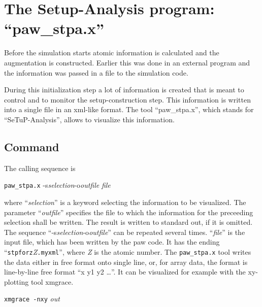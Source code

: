 \documentclass[final,12pt,makeidx,DIV=calc]{article}
\begin{document}
{{{{{{%
\newpage
\section{The Setup-Analysis program: ``paw\_stpa.x''}
Before the simulation starts atomic information is calculated and the
augmentation is constructed. Earlier this was done in an external
program and the information was passed in a file to the simulation code.

During this initialization step a lot of information is created that
is meant to control and to monitor the setup-construction step. This
information is written into a single file in an xml-like format. The
tool ``paw\_stpa.x'', which stands for ``SeTuP-Analysis'', allows to
visualize this information.

\subsection{Command}

The calling sequence is
\begin{center}
\verb|paw_stpa.x| 
\quad-s\quad\textit{selection}\quad\textrm{-o}\quad\textit{outfile} \quad\textit{file}
\end{center}
where ``\textit{selection}'' is a keyword selecting the information to
be visualized.  The parameter ``\textit{outfile}'' specifies the file
to which the information for the preceeding selection shall be
written. The result is written to standard out, if it is omitted.  The
sequence
``-s\quad\textit{selection}\quad\textrm{-o}\quad\textit{outfile}'' can
be repeated several times.  ``\textit{file}'' is the input file, which
has been written by the paw code. It has the ending
``\verb|stpforz|\textit{Z}\verb|.myxml|'', where \textit{Z} is the
atomic number. The \verb|paw_stpa.x| tool writes the data either in
free format onto single line, or, for array data, the format is
line-by-line free format ``x y1 y2 \ldots''.  It can be visualized for
example with the xy-plotting tool xmgrace.
\begin{center}
\verb|xmgrace -nxy| \textit{out}
\end{center}

}}}}}}
\end{document}
